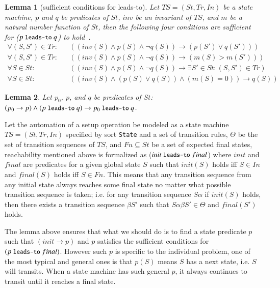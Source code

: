 \documentclass[12pt]{report}
\newtheorem{lemma}{Lemma}
\newcommand{\ra}{\rightarrow}
\newcommand{\mbstt}[1]{\mbox{\small{\tt {#1}}}}
\begin{document}
\begin{lemma}[sufficient conditions for leads-to]
  Let $TS=(St,Tr,In)$ be a state machine, $p$ and $q$ be predicates of
  $St$, $inv$ be an invariant of $TS$, and $m$ be a natural number
  function of $St$, then the following four conditions are sufficient
  for ($p~\mbstt{leads-to}~q$) to hold~\cite{Futatsugi15}.
\begin{eqnarray*}
\forall (S,S')\in Tr:&&((inv(S)\land p(S)\land\neg q(S))\ra(p(S')\lor q(S')))\\
\forall (S,S')\in Tr:&&((inv(S)\land p(S)\land\neg q(S))\ra(m(S) > m(S')))\\
\forall S\in St:&&((inv(S)\land p(S)\land\neg q(S))\ra\exists S'\in St:(S,S')\in Tr)\\
\forall S\in St:&&((inv(S)\land (p(S)\lor q(S))\land(m(S) = 0)) \ra q(S))
\end{eqnarray*}
\end{lemma}

\begin{lemma}
  Let $p_0$, $p$, and $q$ be predicates of $St$:
  $(p_0 \ra p) \land (p~\mbstt{leads-to}~q) \ra
  p_0~\mbstt{leads-to}~q$.
\end{lemma}

Let the automation of a setup operation be modeled as a state machine
$TS=(St,Tr,In)$ specified by sort {\tt State} and a set of transition
rules, $\Theta$ be the set of transition sequences of $TS$, and
$Fn\subseteq St$ be a set of expected final states, reachability
mentioned above is formalized as ($init~\mbstt{leads-to}~final$) where
$init$ and $final$ are predicates for a given global state $S$ such
that $init(S)$ holds iff $S \in In$ and $final(S)$ holds iff $S \in
Fn$. This means that any transition sequence from any initial state
always reaches some final state no matter what possible transition
sequence is taken; i.e. for any transition sequence $S\alpha$ if
$init(S)$ holds, then there exists a transition sequence $\beta S'$
such that $S\alpha\beta S'\in\Theta$ and $final(S')$ holds.

The lemma above ensures that what we should do is to find a state
predicate $p$ such that $(init\ra p)$ and $p$ satisfies the sufficient
conditions for $(p~\mbstt{leads-to}~final)$. However such $p$ is
specific to the individual problem, one of the most typical and
general ones is that $p(S)$ means $S$ has a next state, i.e. $S$ will
transits.  When a state machine has such general $p$, it always
continues to transit until it reaches a final state.
\end{document}
